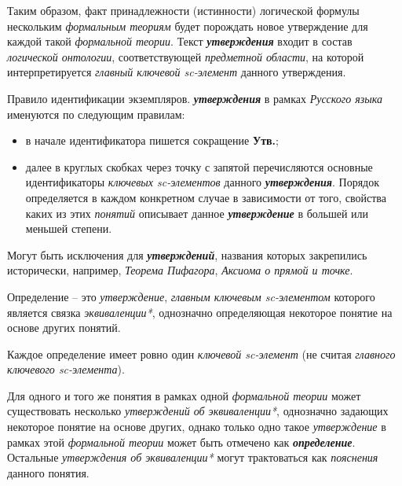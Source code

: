 Таким образом, факт принадлежности (истинности) логической формулы нескольким \textit{формальным теориям} будет порождать новое утверждение для каждой такой \textit{формальной теории}. Текст \textbf{\textit{утверждения}} входит в состав \textit{логической онтологии}, соответствующей \textit{предметной области}, на которой интерпретируется \textit{главный ключевой sc-элемент\scnrolesign} данного утверждения.

Правило идентификации экземпляров. \textbf{\textit{утверждения}} в рамках \textit{Русского языка} именуются по следующим правилам:
\begin{itemize}
	\item{в начале идентификатора пишется сокращение \textbf{Утв.};}
	\item{далее в круглых скобках через точку с запятой перечисляются основные идентификаторы \textit{ключевых \mbox{sc-элементов}\scnrolesign} данного \textbf{\textit{утверждения}}. Порядок определяется в каждом конкретном случае в зависимости от того, свойства каких из этих \textit{понятий} описывает данное \textbf{\textit{утверждение}} в большей или меньшей степени.}
\end{itemize}

Могут быть исключения для \textbf{\textit{утверждений}}, названия которых закрепились исторически, например, \textit{Теорема Пифагора}, \textit{Аксиома о прямой и точке}.



Определение -- это \textit{утверждение}, \textit{главным ключевым sc-элементом\scnrolesign} которого является связка \textit{эквиваленции*}, однозначно определяющая некоторое понятие на основе других понятий.

Каждое определение имеет ровно один \textit{ключевой sc-элемент\scnrolesign} (не считая \textit{главного ключевого sc-элемента\scnrolesign}).

Для одного и того же понятия в рамках одной \textit{формальной теории} может существовать несколько \textit{утверждений об эквиваленции*}, однозначно задающих некоторое понятие на основе других, однако только одно такое \textit{утверждение} в рамках этой \textit{формальной теории} может быть отмечено как \textbf{\textit{определение}}. Остальные \textit{утверждения об эквиваленции*} могут трактоваться как \textit{пояснения} данного понятия.

